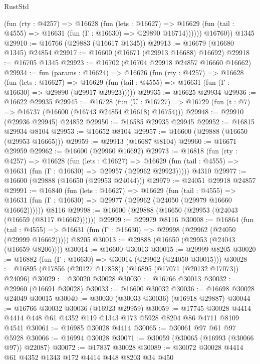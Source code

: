 \begin{lexlean}{RustStd}
\begin{coremodule}
            (fun (rty : @4257) =>
            @16628
              (fun (lets : @16627) =>
              @16629 (fun (tail : @4555) => @16631 (fun (Γ : @16630) => @29890 @16714))))))
        @16760))
    @1345
@29910 := @16766 (@29883 (@16617 @1345))
@29913 := @16679 (@16680 @1345) @24854
@29917 := @16600 (@16671 (@29913 @16688) @16692)
@29918 := @16705 @1345
@29923 := @16702 (@16704 @29918 @24857 @16660 @16662)
@29934 := fun (params : @16624) =>
  @16626
    (fun (rty : @4257) =>
    @16628
      (fun (lets : @16627) =>
      @16629 (fun (tail : @4555) => @16631 (fun (Γ : @16630) => @29890 (@29917 @29923)))))
@29935 := @16625 @29934
@29936 := @16622 @29935
@29945 := @16728
    (fun (U : @16727) => @16729 (fun (t : @7) => @16737 (@16600 (@16743 @24854 @16618) @16754)))
@29948 := @29910 (@29936 @29945) @24852
@29950 := @16585 @29935 @29945
@29952 := @16815 @29934 @8104
@29953 := @16652 @8104
@29957 := @16600 (@29888 (@16650 (@29953 @16665)))
@29959 := @29913 (@16687 @8104)
@29960 := @16671 @29959
@29962 := @16600 (@29960 @16692)
@29973 := @16818
    (fun (rty : @4257) =>
    @16628
      (fun (lets : @16627) =>
      @16629 (fun (tail : @4555) => @16631 (fun (Γ : @16630) => @29957 (@29962 @29923)))))
    @4310
@29977 := @16600 (@29888 (@16650 (@29953 @24044)))
@29979 := @24051 @29918 @24857
@29991 := @16840
    (fun (lets : @16627) =>
    @16629
      (fun (tail : @4555) =>
      @16631 (fun (Γ : @16630) => @29977 (@29962 (@24050 (@29979 @16660 @16662))))))
    @8116
@29998 := @16600 (@29888 (@16650 (@29953 (@24043 (@16659 (@8117 @16662))))))
@29999 := @29979 @8116
@30008 := @16864
    (fun (tail : @4555) => @16631 (fun (Γ : @16630) => @29998 (@29962 (@24050 (@29999 @16662)))))
    @8205
@30013 := @29888 (@16650 (@29953 (@24043 (@16659 @8206))))
@30014 := @16600 @30013
@30015 := @29999 @8205
@30020 := @16882 (fun (Γ : @16630) => @30014 (@29962 (@24050 @30015)))
@30028 := @16895 (@17856 (@20127 @17858)) (@16895 (@17071 (@20132 @17073)) @24096)
@30029 := @30020 @30028
@30030 := @16766 @30013
@30032 := @29960 (@16691 @30028)
@30033 := @16600 @30032
@30036 := @16698 @30028 @24049 @30015
@30040 := @30030 (@30033 @30036) (@16918 @29887)
@30044 := @16766 @30032 @30036 (@16923 @29959)
@30059 := @17745 @30028 @4414 @4414 @448 @61 @4352 @119 @1343 @173 @5928 @8204 @86 @4711 @8109 @4541
@30061 := @16985 @30028 @4414
@30065 := @30061 @97 @61 @97 @5928
@30066 := @16994 @30028
@30071 := @30059 (@30065 (@16993 (@30066 @97)) @22087)
@30072 := @17837 @30028
@30089 := @30072
    @30028
    @4414
    @61
    @4352
    @1343
    @172
    @4414
    @448
    @8203
    @34
    @450

\end{coremodule}
\end{lexlean}
